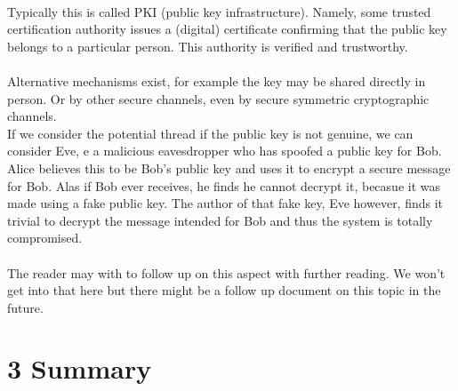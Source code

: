 \documentclass[11pt]{article}   	%
\begin{document}
\\
Typically this is called PKI (public key infrastructure). Namely, some trusted certification authority issues a (digital) certificate confirming that the public key belongs to a particular person. This authority is verified and trustworthy. \\
\\
Alternative mechanisms exist, for example the key may be shared directly in person. Or by other secure channels, even by secure symmetric cryptographic channels.
\\
If we consider the potential thread if the public key is not genuine, we can consider Eve, e a malicious eavesdropper who has spoofed a public key for Bob. Alice believes this to be Bob's public key and uses it to encrypt a secure message for Bob. Alas if Bob ever receives, he finds he cannot decrypt it, becasue it was made using a fake public key. The author of that fake key, Eve however, finds it trivial to decrypt the message intended for Bob and thus the system is totally compromised. \\
\\
The reader may with to follow up on this aspect with further reading.  We won't get into that here but there might be a follow up document on this topic in the future.

\break


\section*{3 Summary}
\end{document}
